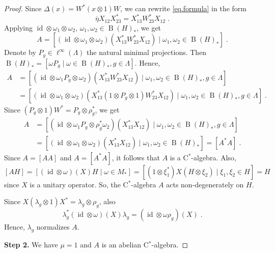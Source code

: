 \documentclass[a4paper,11pt]{amsart}
\numberwithin{equation}{section}
\begin{document}
\begin{proof}
Since ${\Delta}(x) = W^* (x {\otimes} 1) W$, we can rewrite \eqref{eq.formula} in the form
\begin{equation}\label{eq.alternative}
\overline{\eta} X_{12} X_{23}^* = X^*_{13} W^*_{23} X_{12} \; .
\end{equation}
Applying ${\mathord{\operatorname{id}}} {\otimes} {\omega}_1 {\otimes} {\omega}_2$, ${\omega}_1,{\omega}_2 \in {\operatorname{B}}(H)_*$, we get
$$A = [({\mathord{\operatorname{id}}} {\otimes} {\omega}_1 {\otimes} {\omega}_2)(X^*_{13} W^*_{23} X_{12}) \mid {\omega}_1,{\omega}_2 \in {\operatorname{B}}(H)_*] \; .$$
Denote by $P_g \in \ell^\infty(\Lambda)$ the natural minimal projections. Then ${\operatorname{B}}(H)_* = [{\omega} P_g \mid {\omega} \in {\operatorname{B}}(H)_* , g \in \Lambda]$. Hence,
\begin{align*}
A &= [({\mathord{\operatorname{id}}} {\otimes} {\omega}_1 P_g {\otimes} {\omega}_2)(X^*_{13} W^*_{23} X_{12}) \mid {\omega}_1,{\omega}_2 \in {\operatorname{B}}(H)_*, g \in \Lambda] \\
&=[({\mathord{\operatorname{id}}} {\otimes} {\omega}_1 {\otimes} {\omega}_2)(X^*_{13} (1 {\otimes} P_g {\otimes} 1)W^*_{23} X_{12}) \mid {\omega}_1,{\omega}_2 \in {\operatorname{B}}(H)_*, g \in \Lambda] \; .
\end{align*}
Since $(P_g {\otimes} 1)W^* = P_g {\otimes} \rho_g^*$, we get
\begin{align*}
A &= [({\mathord{\operatorname{id}}} {\otimes} {\omega}_1 P_g {\otimes} \rho_g^* {\omega}_2)(X^*_{13} X_{12}) \mid {\omega}_1,{\omega}_2 \in {\operatorname{B}}(H)_*, g \in \Lambda] \\
&= [({\mathord{\operatorname{id}}} {\otimes} {\omega}_1 {\otimes} {\omega}_2)(X^*_{13} X_{12}) \mid {\omega}_1,{\omega}_2 \in {\operatorname{B}}(H)_*]  = [A^* A] \; .
\end{align*}
Since $A = [A A]$ and $A = [A^* A]$, it follows that $A$ is a C$^*$-algebra. Also,
$$[A H] = [({\mathord{\operatorname{id}}} {\otimes} {\omega})(X)H \mid {\omega} \in M_*] = [(1 {\otimes} \xi_1^*) X (H {\otimes} \xi_2) \mid \xi_1,\xi_2 \in H] = H$$
since $X$ is a unitary operator. So, the C$^*$-algebra $A$ acts non-degenerately on $H$.

Since $X(\lambda_g {\otimes} 1) X^* = \lambda_g {\otimes} \rho_g$, also
$$\lambda_g^* ({\mathord{\operatorname{id}}} {\otimes} {\omega})(X) \lambda_g = ({\mathord{\operatorname{id}}} {\otimes} {\omega}\rho_g)(X) \; .$$
Hence, $\lambda_g$ normalizes $A$.

{\bf Step 2.} We have $\mu = 1$ and $A$ is an abelian C$^*$-algebra.


\end{proof}
\end{document}
